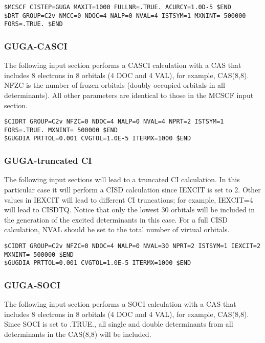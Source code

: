 \begin{lstlisting}[style=GAMESS]
$MCSCF CISTEP=GUGA MAXIT=1000 FULLNR=.TRUE. ACURCY=1.0D-5 $END
$DRT GROUP=C2v NMCC=0 NDOC=4 NALP=0 NVAL=4 ISTSYM=1 MXNINT= 500000 FORS=.TRUE. $END
\end{lstlisting}

\subsubsection{GUGA-CASCI}
The following input section performs a CASCI calculation with a CAS that includes 8
electrons in 8 orbitals (4 DOC and 4 VAL), for example, CAS(8,8). NFZC is the number of frozen
orbitals (doubly occupied orbitals in all determinants). All other parameters are identical
to those in the MCSCF input section.

\begin{lstlisting}[style=GAMESS]
$CIDRT GROUP=C2v NFZC=0 NDOC=4 NALP=0 NVAL=4 NPRT=2 ISTSYM=1 FORS=.TRUE. MXNINT= 500000 $END
$GUGDIA PRTTOL=0.001 CVGTOL=1.0E-5 ITERMX=1000 $END
\end{lstlisting}

\subsubsection{GUGA-truncated CI}
The following input sections will lead to a truncated CI calculation. In this particular case
it will perform a CISD calculation since IEXCIT is set to 2. Other values in IEXCIT will lead
to different CI truncations; for example, IEXCIT=4 will lead to CISDTQ. Notice that only
the lowest 30 orbitals will be included in the generation of the excited determinants in this
case. For a full CISD calculation, NVAL should be set to the total number of virtual orbitals.

\begin{lstlisting}[style=GAMESS]
$CIDRT GROUP=C2v NFZC=0 NDOC=4 NALP=0 NVAL=30 NPRT=2 ISTSYM=1 IEXCIT=2 MXNINT= 500000 $END
$GUGDIA PRTTOL=0.001 CVGTOL=1.0E-5 ITERMX=1000 $END
\end{lstlisting}

\subsubsection{GUGA-SOCI}
The following input section performs a SOCI calculation with a CAS that includes 8
electrons in 8 orbitals (4 DOC and 4 VAL), for example, CAS(8,8). Since SOCI is set to .TRUE.,
all single and double determinants from all determinants in the CAS(8,8) will be included.

